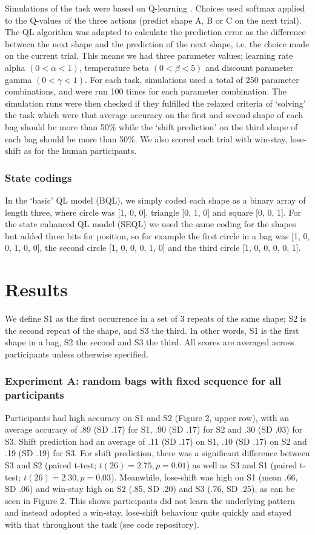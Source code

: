 \documentclass[10pt,letterpaper]{article}
\begin{document}
Simulations of the task were based on Q-learning \cite{Watkins1992-rn}. Choices used softmax applied to the Q-values of the three actions (predict shape A, B or C on the next trial). The QL algorithm was adapted to calculate the prediction error as the difference between the next shape and the prediction of the next shape, i.e. the choice made on the current trial. This means we had three parameter values; learning rate alpha $(0 < \alpha < 1)$, temperature beta $(0 < \beta < 5)$ and discount parameter gamma $(0 < \gamma < 1)$. For each task, simulations used a total of 250 parameter combinations, and were run 100 times for each parameter combination. The simulation runs were then checked if they fulfilled the relaxed criteria of ‘solving’ the task which were that average accuracy on the first and second shape of each bag should be more than 50\% while the ‘shift prediction’ on the third shape of each bag should be more than 50\%. We also scored each trial with win-stay, lose-shift as for the human participants.

\subsubsection{State codings} In the ‘basic’ QL model (BQL), we simply coded each shape as a binary array of length three, where circle was [1, 0, 0], triangle [0, 1, 0] and square [0, 0, 1]. For the state enhanced QL model (SEQL) we used the same coding for the shapes but added three bits for position, so for example the first circle in a bag was [1, 0, 0, 1, 0, 0], the second circle [1, 0, 0, 0, 1, 0] and the third circle [1, 0, 0, 0, 0, 1].

\section{Results}

We define S1 as the first occurrence in a set of 3 repeats of the same shape; S2 is the second repeat of the shape, and S3 the third. In other words, S1 is the first shape in a bag, S2 the second and S3 the third. All scores are averaged across participants unless otherwise specified.

\subsubsection{Experiment A: random bags with fixed sequence for all participants}
Participants had high accuracy on S1 and S2 (Figure 2, upper row), with an average accuracy of .89 (SD .17) for S1, .90 (SD .17) for S2 and .30 (SD .03) for S3. Shift prediction had an average of .11 (SD .17) on S1, .10 (SD .17) on S2 and .19 (SD .19) for S3. For shift prediction, there was a significant difference between S3 and S2 (paired t-test; $t(26)=2.75, p=0.01$) as well as S3 and S1 (paired t-test; $t(26)=2.30, p=0.03$). Meanwhile, lose-shift was high on S1 (mean .66, SD .06) and win-stay high on S2 (.85, SD .20) and S3 (.76, SD .25), as can be seen in Figure 2. This shows participants did not learn the underlying pattern and instead adopted a win-stay, lose-shift behaviour quite quickly and stayed with that throughout the task (see code repository).
\end{document}
